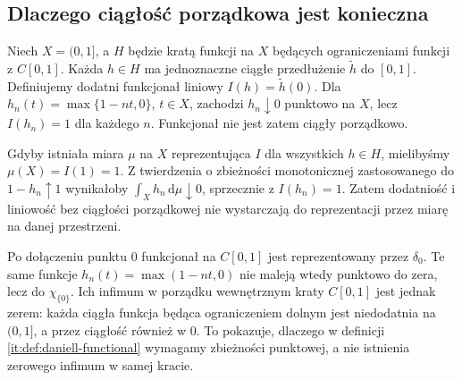 \subsection{Dlaczego ciągłość porządkowa jest konieczna}
\begin{przyklad}\label{prz:daniel-koniecznosc}
Niech $X=(0,1]$, a $H$ będzie kratą funkcji na $X$ będących ograniczeniami funkcji z $C[0,1]$. Każda $h\in H$ ma jednoznaczne ciągłe przedłużenie $\widetilde h$ do $[0,1]$. Definiujemy dodatni funkcjonał liniowy $I(h)=\widetilde h(0)$. Dla $h_n(t)=\max\{1-nt,0\}$, $t\in X$, zachodzi $h_n\downarrow0$ punktowo na $X$, lecz $I(h_n)=1$ dla każdego $n$. Funkcjonał nie jest zatem ciągły porządkowo.

Gdyby istniała miara $\mu$ na $X$ reprezentująca $I$ dla wszystkich $h\in H$, mielibyśmy $\mu(X)=I(1)=1$. Z twierdzenia o zbieżności monotonicznej zastosowanego do $1-h_n\uparrow1$ wynikałoby $\int_Xh_n\,\mathrm d\mu\downarrow0$, sprzecznie z $I(h_n)=1$. Zatem dodatniość i liniowość bez ciągłości porządkowej nie wystarczają do reprezentacji przez miarę na danej przestrzeni.

Po dołączeniu punktu $0$ funkcjonał na $C[0,1]$
jest reprezentowany przez $\delta_0$. Te same
funkcje $h_n(t)=\max(1-nt,0)$ nie maleją wtedy
punktowo do zera, lecz do $\chi_{\{0\}}$.
Ich infimum w porządku wewnętrznym kraty $C[0,1]$
jest jednak zerem: każda ciągła funkcja będąca
ograniczeniem dolnym jest niedodatnia na $(0,1]$,
a przez ciągłość również w $0$. To pokazuje, dlaczego
w definicji \ref{it:def:daniell-functional} wymagamy
zbieżności punktowej, a nie istnienia zerowego
infimum w samej kracie.
\end{przyklad}
